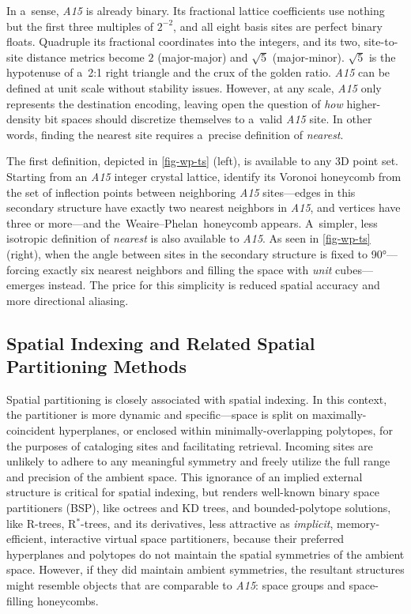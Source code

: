 \documentclass[10pt]{article}
\def\AAAB{\textit{A15}}
\def\tWPh{the~Weaire--Phelan~honeycomb}
\begin{document}
In a~sense, \AAAB{} is already binary. Its fractional lattice coefficients use nothing but the first three multiples of $2^{-2}$,
and all eight basis sites are perfect binary floats. Quadruple its fractional coordinates into the integers, and its two,
site-to-site distance metrics become $2$ (major-major) and $\sqrt{5}$ (major-minor). $\sqrt{5}$ is the hypotenuse of a~2:1 right
triangle and the crux of the golden ratio. \AAAB{} can be defined at unit scale without stability issues. However, at any scale,
\AAAB{} only represents the destination encoding, leaving open the question of \emph{how} higher-density bit spaces should
discretize themselves to a~valid \AAAB{} site. In other words, finding the nearest site requires a~precise definition of
\emph{nearest}.

The first definition, depicted in \autoref{fig-wp-ts} (left), is available to any 3D point set. Starting from an \AAAB{} integer
crystal lattice, identify its Voronoi honeycomb from the set of inflection points between neighboring \AAAB{} sites---edges in
this secondary structure have exactly two nearest neighbors in \AAAB{}, and vertices have three or more---and \tWPh{} appears.
A~simpler, less isotropic definition of \emph{nearest} is also available to \AAAB{}. As seen in \autoref{fig-wp-ts} (right), when
the angle between sites in the secondary structure is fixed to 90°---forcing exactly six nearest neighbors and filling the space
with \emph{unit} cubes---\tTSp{} emerges instead. The price for this simplicity is reduced spatial accuracy and more directional
aliasing.

\subsection{Spatial Indexing and Related Spatial Partitioning Methods}\label{spatial-indexing-and-related-spatial-partitioning-methods}

Spatial partitioning is closely associated with spatial indexing. In this context, the partitioner is more dynamic and
specific---space is split on maximally-coincident hyperplanes, or enclosed within minimally-overlapping polytopes, for the
purposes of cataloging sites and facilitating retrieval. Incoming sites are unlikely to adhere to any meaningful symmetry and
freely utilize the full range and precision of the ambient space. This ignorance of an implied external structure is critical for
spatial indexing, but renders well-known binary space partitioners (BSP), like octrees and KD trees, and bounded-polytope
solutions, like R-trees, R$^*$-trees, and its derivatives, less attractive as \emph{implicit}, memory-efficient, interactive
virtual space partitioners, because their preferred hyperplanes and polytopes do not maintain the spatial symmetries of the
ambient space. However, if they did maintain ambient symmetries, the resultant structures might resemble objects that are
comparable to \AAAB{}: space groups and space-filling honeycombs.
\end{document}

